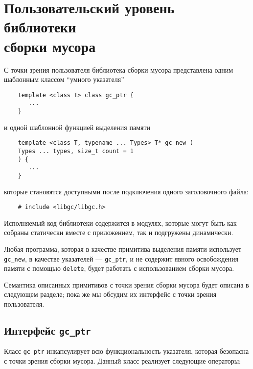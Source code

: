 \section {Пользовательский уровень библиотеки\\
сборки мусора}

С точки зрения пользователя библиотека сборки мусора представлена одним шаблонным классом
``умного указателя'' 

\begin{lstlisting}
    template <class T> class gc_ptr {
       ...
    }
\end{lstlisting}

и одной шаблонной функцией выделения памяти

\begin{lstlisting}
    template <class T, typename ... Types> T* gc_new (
    Types ... types, size_t count = 1
    ) {
       ...
    }
\end{lstlisting}

которые становятся доступными после подключения одного заголовочного файла:

\begin{lstlisting}
    # include <libgc/libgc.h>
\end{lstlisting}

Исполняемый код библиотеки содержится в модулях, которые могут быть как собраны статически вместе
с приложением, так и подгружены динамически.

Любая программа, которая в качестве примитива выделения памяти использует \lstinline{gc_new}, в качестве
указателей --- \lstinline{gc_ptr}, и не содержит явного освобождения памяти с помощью \lstinline{delete}, будет
работать с использованием сборки мусора.

Семантика описанных примитивов с точки зрения сборки мусора будет описана в следующем разделе; пока же
мы обсудим их интерфейс с точки зрения пользователя.

\subsection{Интерфейс \lstinline{gc_ptr}}

Класс \lstinline{gc_ptr} инкапсулирует всю функциональность указателя, которая безопасна с точки зрения
сборки мусора. Данный класс реализует следующие операторы:

